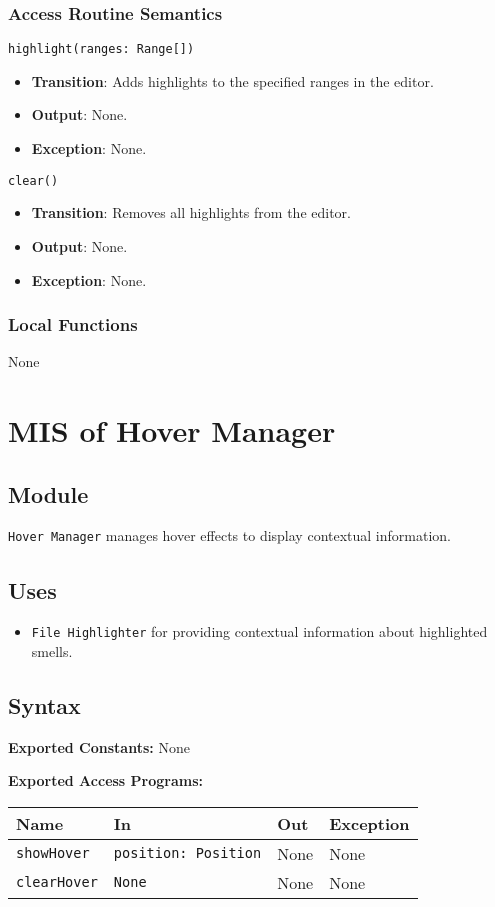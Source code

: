 \documentclass[12pt, titlepage]{article}
\begin{document}
\subsubsection{Access Routine Semantics}
\texttt{highlight(ranges: Range[])}
\begin{itemize}
\item \textbf{Transition}: Adds highlights to the specified ranges in the editor.
\item \textbf{Output}: None.
\item \textbf{Exception}: None.
\end{itemize}

\texttt{clear()}
\begin{itemize}
\item \textbf{Transition}: Removes all highlights from the editor.
\item \textbf{Output}: None.
\item \textbf{Exception}: None.
\end{itemize}

\subsubsection{Local Functions}
None

\section{MIS of Hover Manager}

\subsection{Module}
\texttt{Hover Manager} manages hover effects to display contextual information.

\subsection{Uses}
\begin{itemize}
\item \texttt{File Highlighter} for providing contextual information about highlighted smells.
\end{itemize}

\subsection{Syntax}

\textbf{Exported Constants:} None

\textbf{Exported Access Programs:}\\
\begin{tabularx}{\linewidth}{|l|>{\raggedright\arraybackslash}X|l|l|}
  \hline
  \textbf{Name} & \textbf{In} & \textbf{Out} & \textbf{Exception} \\
  \hline
  \texttt{showHover} & \texttt{position: Position} & None & None \\ \hline
  \texttt{clearHover} & \texttt{None} & None & None \\
  \hline
\end{tabularx}
\end{document}
